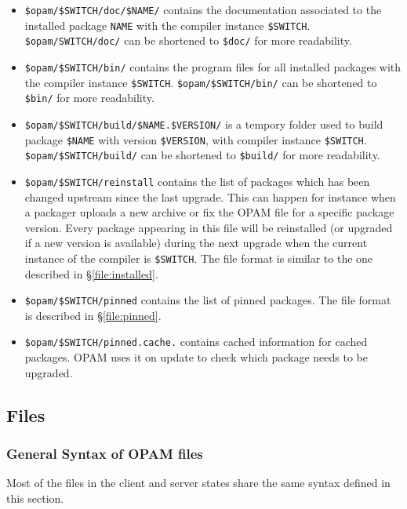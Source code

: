 \documentclass[a4paper,11pt]{article}
\begin{document}
\begin{itemize}
\item \verb+$opam/$SWITCH/doc/$NAME/+ contains the documentation
  associated to the installed package {\tt NAME} with the compiler
  instance \verb+$SWITCH+. \verb+$opam/SWITCH/doc/+ can be
  shortened to \verb+$doc/+ for more readability.

\item \verb+$opam/$SWITCH/bin/+ contains the program files for all
  installed packages with the compiler instance
  \verb+$SWITCH+. \verb+$opam/$SWITCH/bin/+ can be shortened to
  \verb+$bin/+ for more readability.

\item \verb+$opam/$SWITCH/build/$NAME.$VERSION/+ is a tempory folder
  used to build package \verb+$NAME+ with version \verb+$VERSION+,
  with compiler instance \verb+$SWITCH+. \verb+$opam/$SWITCH/build/+
  can be shortened to \verb+$build/+ for more readability.

\item \verb+$opam/$SWITCH/reinstall+ contains the list of packages
  which has been changed upstream since the last upgrade. This can
  happen for instance when a packager uploads a new archive or fix the
  OPAM file for a specific package version. Every package appearing in
  this file will be reinstalled (or upgraded if a new version is
  available) during the next upgrade when the current instance of the
  compiler is \verb+$SWITCH+. The file format is similar to the one
  described in \S\ref{file:installed}.

\item \verb+$opam/$SWITCH/pinned+ contains the list of pinned
  packages. The file format is described in \S\ref{file:pinned}.

\item \verb+$opam/$SWITCH/pinned.cache.+ contains cached information
  for cached packages. OPAM uses it on update to check which package
  needs to be upgraded.
\end{itemize}

\subsection{Files}

\subsubsection{General Syntax of OPAM files}
\label{file:general}

Most of the files in the client and server states share the same
syntax defined in this section.
\end{document}
